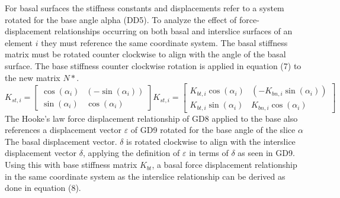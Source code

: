 \documentclass[12pt]{article}
\begin{document}
For basal surfaces the stiffness constants and displacements refer to a system rotated for the base angle alpha (DD5). To analyze the effect of force-displacement relationships occurring on both basal and interslice surfaces of an element $i$ they must reference the same coordinate system. The basal stiffness matrix must be rotated counter clockwise to align with the angle of the basal surface. The base stiffness counter clockwise rotation is applied in equation (7) to the new matrix $N*$.
\begin{dmath}
{K_{st,i}}=\begin{bmatrix}
\cos\left(\alpha{}_{i}\right) & \left(-\sin\left(\alpha{}_{i}\right)\right)\\
\sin\left(\alpha{}_{i}\right) & \cos\left(\alpha{}_{i}\right)
\end{bmatrix} {K_{st,i}}=\begin{bmatrix}
{K_{bt,i}} \cos\left(\alpha{}_{i}\right) & \left(-{K_{bn,i}} \sin\left(\alpha{}_{i}\right)\right)\\
{K_{bt,i}} \sin\left(\alpha{}_{i}\right) & {K_{bn,i}} \cos\left(\alpha{}_{i}\right)
\end{bmatrix}
\end{dmath}
The Hooke's law force displacement relationship of GD8 applied to the base also references a displacement vector $\varepsilon{}$ of GD9 rotated for the base angle of the slice $\alpha{}$ The basal displacement vector. $\delta{}$ is rotated clockwise to align with the interslice displacement vector $\delta{}$, applying the definition of $\varepsilon{}$ in terms of $\delta{}$ as seen in GD9. Using this with base stiffness matrix ${K_{bt}}$, a basal force displacement relationship in the same coordinate system as the interslice relationship can be derived as done in equation (8).
\end{document}
